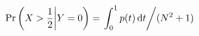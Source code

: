\documentclass[nofonts]{ctexart}
\begin{document}
\[
	\Pr \left( X>\frac{1}{2}
	\middle\vert Y=0 \right)
	= \left.
	\int_0^1 p(t)\,\mathrm{d}t
	\middle/ (N^2+1) \right.
\]
\end{document}
